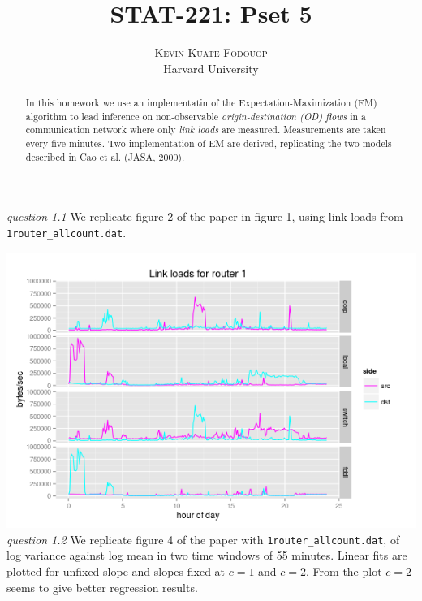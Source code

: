 \documentclass[twoside]{article}
\title{\vspace{-15mm}\fontsize{24pt}{10pt}\selectfont\textbf{STAT-221: Pset 5}} %
\author{
\large
\textsc{Kevin Kuate Fodouop}\\ %
\normalsize Harvard University \\ %
\vspace{-5mm}
}
\date{}
\begin{document}
\maketitle %

\thispagestyle{fancy} %


\begin{abstract}
In this homework we use an implementatin of the Expectation-Maximization (EM) algorithm to lead inference on non-observable \textit{ origin-destination (OD) flows} in a communication network where only \textit{link loads} are measured. Measurements are taken every five minutes. Two implementation of EM are derived, replicating the two models described in Cao et al. (JASA, 2000).

\end{abstract}




\textit{question 1.1} We replicate figure 2 of the paper in figure 1, using link loads from \texttt{1router\_allcount.dat}.

\begingroup
\centering
\includegraphics[scale=0.50]{./img/linkload_rout1.png}
\endgroup
\vspace{.2 in}
\textit{question 1.2} We replicate figure 4 of the paper with \texttt{1router\_allcount.dat}, of log variance against log mean in two time windows of 55 minutes. Linear fits are plotted for unfixed slope and slopes fixed at $c = 1$ and $c=2$. From the plot $c=2$ seems to give better regression results.
\end{document}
